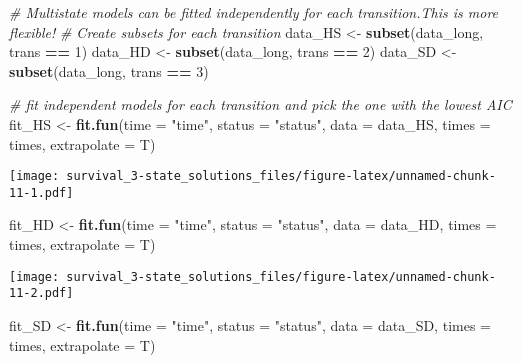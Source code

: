 \documentclass[
]{article}
\newenvironment{Shaded}{\begin{snugshade}}{\end{snugshade}}
\newcommand{\CommentTok}[1]{\textcolor[rgb]{0.56,0.35,0.01}{\textit{#1}}}
\newcommand{\DataTypeTok}[1]{\textcolor[rgb]{0.13,0.29,0.53}{#1}}
\newcommand{\DecValTok}[1]{\textcolor[rgb]{0.00,0.00,0.81}{#1}}
\newcommand{\KeywordTok}[1]{\textcolor[rgb]{0.13,0.29,0.53}{\textbf{#1}}}
\newcommand{\NormalTok}[1]{#1}
\newcommand{\OperatorTok}[1]{\textcolor[rgb]{0.81,0.36,0.00}{\textbf{#1}}}
\newcommand{\StringTok}[1]{\textcolor[rgb]{0.31,0.60,0.02}{#1}}
\begin{document}
\begin{Shaded}
\begin{Highlighting}[]
\CommentTok{# Multistate models can be fitted independently for each transition.This is more flexible!}
\CommentTok{# Create subsets for each transition}
\NormalTok{data_HS <-}\StringTok{ }\KeywordTok{subset}\NormalTok{(data_long, trans }\OperatorTok{==}\StringTok{ }\DecValTok{1}\NormalTok{)}
\NormalTok{data_HD <-}\StringTok{ }\KeywordTok{subset}\NormalTok{(data_long, trans }\OperatorTok{==}\StringTok{ }\DecValTok{2}\NormalTok{)}
\NormalTok{data_SD <-}\StringTok{ }\KeywordTok{subset}\NormalTok{(data_long, trans }\OperatorTok{==}\StringTok{ }\DecValTok{3}\NormalTok{)}


\CommentTok{# fit independent models for each transition and pick the one with the lowest AIC}
\NormalTok{fit_HS <-}\StringTok{ }\KeywordTok{fit.fun}\NormalTok{(}\DataTypeTok{time =} \StringTok{"time"}\NormalTok{, }\DataTypeTok{status =} \StringTok{"status"}\NormalTok{, }\DataTypeTok{data =}\NormalTok{ data_HS, }\DataTypeTok{times =}\NormalTok{ times, }
                  \DataTypeTok{extrapolate =}\NormalTok{ T)}
\end{Highlighting}
\end{Shaded}

\texttt{[image: survival\_3-state\_solutions\_files/figure-latex/unnamed-chunk-11-1.pdf]}

\begin{Shaded}
\begin{Highlighting}[]
\NormalTok{fit_HD <-}\StringTok{ }\KeywordTok{fit.fun}\NormalTok{(}\DataTypeTok{time =} \StringTok{"time"}\NormalTok{, }\DataTypeTok{status =} \StringTok{"status"}\NormalTok{, }\DataTypeTok{data =}\NormalTok{ data_HD, }\DataTypeTok{times =}\NormalTok{ times, }
                  \DataTypeTok{extrapolate =}\NormalTok{ T)}
\end{Highlighting}
\end{Shaded}

\texttt{[image: survival\_3-state\_solutions\_files/figure-latex/unnamed-chunk-11-2.pdf]}

\begin{Shaded}
\begin{Highlighting}[]
\NormalTok{fit_SD <-}\StringTok{ }\KeywordTok{fit.fun}\NormalTok{(}\DataTypeTok{time =} \StringTok{"time"}\NormalTok{, }\DataTypeTok{status =} \StringTok{"status"}\NormalTok{, }\DataTypeTok{data =}\NormalTok{ data_SD, }\DataTypeTok{times =}\NormalTok{ times, }
                  \DataTypeTok{extrapolate =}\NormalTok{ T)}
\end{Highlighting}
\end{Shaded}
\end{document}
